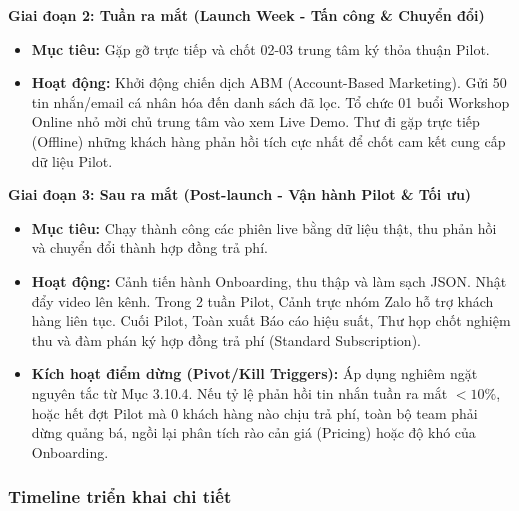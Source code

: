 \textbf{Giai đoạn 2: Tuần ra mắt (Launch Week - Tấn công \& Chuyển đổi)}
\begin{itemize}
    \item \textbf{Mục tiêu:} Gặp gỡ trực tiếp và chốt 02-03 trung tâm ký thỏa thuận Pilot.
    \item \textbf{Hoạt động:} Khởi động chiến dịch ABM (Account-Based Marketing). Gửi 50 tin nhắn/email cá nhân hóa đến danh sách đã lọc. Tổ chức 01 buổi Workshop Online nhỏ mời chủ trung tâm vào xem Live Demo. Thư đi gặp trực tiếp (Offline) những khách hàng phản hồi tích cực nhất để chốt cam kết cung cấp dữ liệu Pilot.
\end{itemize}

\textbf{Giai đoạn 3: Sau ra mắt (Post-launch - Vận hành Pilot \& Tối ưu)}
\begin{itemize}
    \item \textbf{Mục tiêu:} Chạy thành công các phiên live bằng dữ liệu thật, thu phản hồi và chuyển đổi thành hợp đồng trả phí.
    \item \textbf{Hoạt động:} Cảnh tiến hành Onboarding, thu thập và làm sạch JSON. Nhật đẩy video lên kênh. Trong 2 tuần Pilot, Cảnh trực nhóm Zalo hỗ trợ khách hàng liên tục. Cuối Pilot, Toàn xuất Báo cáo hiệu suất, Thư họp chốt nghiệm thu và đàm phán ký hợp đồng trả phí (Standard Subscription).
    \item \textbf{Kích hoạt điểm dừng (Pivot/Kill Triggers):} Áp dụng nghiêm ngặt nguyên tắc từ Mục 3.10.4. Nếu tỷ lệ phản hồi tin nhắn tuần ra mắt $< 10\%$, hoặc hết đợt Pilot mà 0 khách hàng nào chịu trả phí, toàn bộ team phải dừng quảng bá, ngồi lại phân tích rào cản giá (Pricing) hoặc độ khó của Onboarding.
\end{itemize}

\subsubsection{Timeline triển khai chi tiết}

